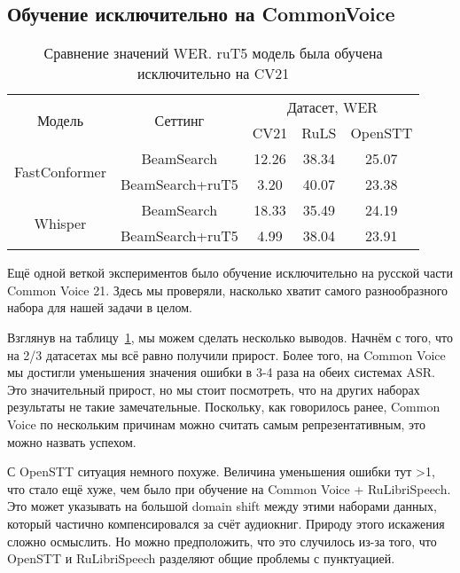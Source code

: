 \subsection{Обучение исключительно на CommonVoice}
\begin{table}[]
\centering
\caption{Сравнение значений WER. ruT5 модель была обучена исключительно на CV21}
\begin{tabular}{|c|c|ccc|}
\hline
\multirow{2}{*}{Модель}        & \multirow{2}{*}{Сеттинг}             & \multicolumn{3}{c|}{Датасет, WER}                                    \\ \cline{3-5} 
                               &                                      & \multicolumn{1}{c|}{CV21}  & \multicolumn{1}{c|}{RuLS}     & OpenSTT \\ \hline
\multirow{2}{*}{FastConformer} & BeamSearch                           & \multicolumn{1}{c|}{12.26} & \multicolumn{1}{c|}{38.34}    & 25.07   \\ \cline{2-5} 
                               & BeamSearch+ruT5                      & \multicolumn{1}{c|}{3.20}  & \multicolumn{1}{c|}{40.07}    & 23.38   \\ \hline
\multirow{2}{*}{Whisper}       & BeamSearch                           & \multicolumn{1}{c|}{18.33} & \multicolumn{1}{c|}{35.49}    & 24.19   \\ \cline{2-5} 
                               & BeamSearch+ruT5                      & \multicolumn{1}{c|}{4.99}  & \multicolumn{1}{c|}{38.04}    & 23.91   \\ \hline
\end{tabular}
\label{tab:res_cv_trained}
\end{table}

Ещё одной веткой экспериментов было обучение исключительно на русской части Common Voice 21.
Здесь мы проверяли, насколько хватит самого разнообразного набора для нашей задачи в целом.

Взглянув на таблицу~\ref{tab:res_cv_trained}, мы можем сделать несколько выводов.
Начнём с того, что на 2/3 датасетах мы всё равно получили прирост.
Более того, на Common Voice мы достигли уменьшения значения ошибки в 3-4 раза на обеих системах ASR.
Это значительный прирост, но мы стоит посмотреть, что на других наборах результаты не такие замечательные.
Поскольку, как говорилось ранее, Common Voice по нескольким причинам можно считать самым репрезентативным, это можно назвать успехом.

С OpenSTT ситуация немного похуже.
Величина уменьшения ошибки тут >1, что стало ещё хуже, чем было при обучение на Common Voice + RuLibriSpeech.
Это может указывать на большой domain shift между этими наборами данных, который частично компенсировался за счёт аудиокниг.
Природу этого искажения сложно осмыслить.
Но можно предположить, что это случилось из-за того, что OpenSTT и RuLibriSpeech разделяют общие проблемы с пунктуацией.

